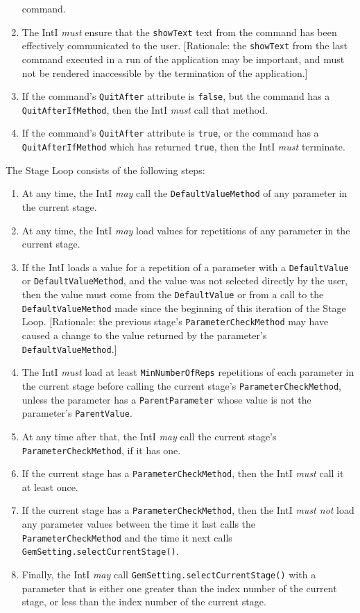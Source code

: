 \documentclass[11pt]{article}
\newcommand{\must}{{\it must}}
\newcommand{\mustnot}{{\it must not}}
\newcounter{coreReq}
\begin{document}
\begin{enumerate}
  command.
\item The IntI {\must} ensure that the {\tt showText} text
  from the command has been effectively communicated to the user. 
  [Rationale: the {\tt showText} from the last command executed in a run
  of the application may be important, and must not be rendered
  inaccessible by the termination of the application.]
\item If the command's {\tt QuitAfter} attribute is
  {\tt false}, but the command has a {\tt QuitAfterIfMethod}, then the
  IntI {\must} call that method.
\item If the command's {\tt QuitAfter} attribute is
  {\tt true}, or the command has a {\tt QuitAfterIfMethod} which has
  returned {\tt true}, then the IntI {\it must} terminate.
\setcounter{coreReq}{\value{enumi}}
\end{enumerate}

\noindent
The Stage Loop consists of the following steps:
\begin{enumerate}
\setcounter{enumi}{\value{coreReq}}
\item At any time, the IntI {\it may} call the
  {\tt DefaultValueMethod} of any parameter in the current
  stage.
\item At any time, the IntI {\it may} load values for
  repetitions of any parameter in the current stage.
\item If the IntI loads a value for a repetition of a parameter
  with a {\tt DefaultValue} or {\tt DefaultValueMethod}, and the
  value was not selected directly by the user, then the value must come
  from the {\tt DefaultValue} or from a call to the
  {\tt DefaultValueMethod} made since the beginning of this iteration of
  the Stage Loop.  [Rationale: the previous stage's
  {\tt ParameterCheckMethod} may have caused a change to the value
  returned by the parameter's {\tt DefaultValueMethod}.]
\item The IntI {\must} load at least {\tt MinNumberOfReps}
  repetitions of each parameter in the current stage before calling
  the current stage's {\tt ParameterCheckMethod},
  unless the parameter has a {\tt ParentParameter} whose value is
  not the parameter's {\tt ParentValue}.
\item At any time after that, the IntI {\it may} call the
  current stage's {\tt ParameterCheckMethod}, if it has one.
\item If the current stage has a {\tt ParameterCheckMethod},
  then the IntI {\must} call it at least once.
\item If the current stage has a {\tt ParameterCheckMethod}, then
  the IntI {\mustnot} load any parameter values between the time
  it last calls the {\tt ParameterCheckMethod} and the time it next
  calls {\tt GemSetting.selectCurrentStage()}.
\item Finally, the IntI {\it may} call {\tt GemSetting.selectCurrentStage()}
  with a parameter that is either one greater than the index number of the
  current stage, or less than the index number of the current stage.
\setcounter{coreReq}{\value{enumi}}
\end{enumerate}
\end{document}
